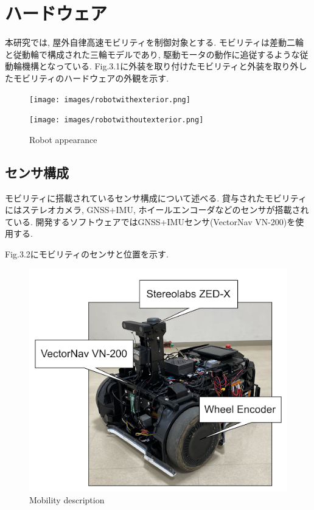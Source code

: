 
\section{ハードウェア}
本研究では, 屋外自律高速モビリティを制御対象とする.
モビリティは差動二輪と従動輪で構成された三輪モデルであり, 駆動モータの動作に追従するような従動輪機構となっている.
Fig.3.1に外装を取り付けたモビリティと外装を取り外したモビリティのハードウェアの外観を示す.

\begin{figure}[h]
     \centering
     \begin{minipage}[c]{65mm}
         \centering
         \texttt{[image: images/robotwithexterior.png]}
     \end{minipage}
     \begin{minipage}[c]{65mm}
         \centering
         \texttt{[image: images/robotwithoutexterior.png]}
     \end{minipage}
     \caption{Robot appearance}
     \label{Fig:RobotGuidance_velocity}
\end{figure}

\subsection{センサ構成}
モビリティに搭載されているセンサ構成について述べる.
貸与されたモビリティにはステレオカメラ, GNSS+IMU, ホイールエンコーダなどのセンサが搭載されている.
開発するソフトウェアではGNSS+IMUセンサ(VectorNav VN-200)を使用する.

Fig.3.2にモビリティのセンサと位置を示す.

\begin{figure}[H]
     \centering
    \includegraphics[keepaspectratio, scale=0.7]
         {images/sensordescription.png}
    \caption{Mobility description}
    \label{fig:MPP}
\end{figure}

